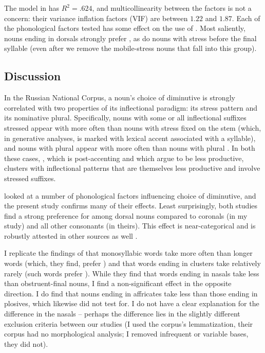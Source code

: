 \documentclass[output=paper,colorlinks,citecolor=brown
]{langscibook}
\begin{document}
The model in  has $R^2=.624$, and multicollinearity between the factors is not a concern: their variance inflation factors (VIF) are between $1.22$ and $1.87$. Each of the phonological factors tested has some effect on the use of \ok. Most saliently, nouns ending in dorsals strongly prefer \ok{}, as do nouns with stress before the final syllable (even after we remove the mobile-stress nouns that fall into this group).

\subsection{Discussion}\label{sec:corpdisc}
In the Russian National Corpus, a noun's choice of diminutive is strongly correlated with two properties of its inflectional paradigm: its stress pattern and its nominative plural. Specifically, nouns with some or all inflectional suffixes stressed appear with \ok{} more often than nouns with stress fixed on the stem (which, in generative analyses, is marked with lexical accent associated with a syllable), and nouns with plural \pla{} appear with \ok{} more often than nouns with plural \pli. In both these cases, \ok, which is post-accenting and which \citet{Magomedova.Slioussar2017} argue to be less productive, clusters with inflectional patterns that are themselves less productive and involve stressed suffixes. %

\citet{Gouskova.etal2015} looked at a number of phonological factors influencing choice of diminutive, and the present study confirms many of their effects. Least surprisingly, both studies find a strong preference for \ok{} among dorsal nouns compared to coronals (in my study) and all other consonants (in theirs). This effect is near-categorical and is robustly attested in other sources as well \citep{Polivanova2008,Kapatsinski2010,Magomedova.Slioussar2017}. %

I replicate the findings of \citet{Gouskova.etal2015} that monosyllabic words take \ok{} more often than longer words (which, they find, prefer \chik) and that words ending in clusters take \ok{} relatively rarely (such words prefer \ik). While they find that words ending in nasals take \ok{} less than obstruent-final nouns, I find a non-significant effect in the opposite direction. I do find that nouns ending in affricates take \ok{} less than those ending in plosives, which \citet{Gouskova.etal2015} likewise did not test for. I do not have a clear explanation for the difference in the nasals -- perhaps the difference lies in the slightly different exclusion criteria between our studies (I used the corpus's lemmatization, their corpus had no morphological analysis; I removed infrequent or variable bases, they did not).
\end{document}
